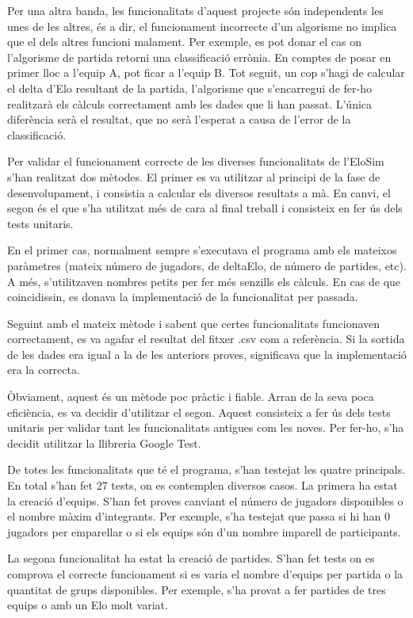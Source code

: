 \documentclass[a4paper]{article}
\begin{document}
Per una altra banda, les funcionalitats d'aquest projecte són independents les unes de les altres, és a dir, el funcionament incorrecte d'un algorisme no implica que el dels altres funcioni malament. Per exemple, es pot donar el cas on l'algorisme de partida retorni una classificació errònia. En comptes de posar en primer lloc a l'equip A, pot ficar a l'equip B. Tot seguit, un cop s'hagi de calcular el delta d'Elo resultant de la partida, l'algorisme que s'encarregui de fer-ho realitzarà els càlculs correctament amb les dades que li han passat. L'única diferència serà el resultat, que no serà l'esperat a causa de l'error de la classificació.

Per validar el funcionament correcte de les diverses funcionalitats de l'EloSim s'han realitzat dos mètodes. El primer es va utilitzar al principi de la fase de desenvolupament, i consistia a calcular els diversos resultats a mà. En canvi, el segon és el que s'ha utilitzat més de cara al final treball i consisteix en fer ús dels tests unitaris.

En el primer cas, normalment sempre s'executava el programa amb els mateixos paràmetres (mateix número de jugadors, de deltaElo, de número de partides, etc). A més, s'utilitzaven nombres petits per fer més senzills els càlculs. En cas de que coincidissin, es donava la implementació de la funcionalitat per passada.

Seguint amb el mateix mètode i sabent que certes funcionalitats funcionaven correctament, es va agafar el resultat del fitxer .csv com a referència. Si la sortida de les dades era igual a la de les anteriors proves, significava que la implementació era la correcta.

Òbviament, aquest és un mètode poc pràctic i fiable. Arran de la seva poca eficiència, es va decidir d'utilitzar el segon. Aquest consisteix a fer ús dels tests unitaris per validar tant les funcionalitats antigues com les noves. Per fer-ho, s'ha decidit utilitzar la llibreria Google Test.

De totes les funcionalitats que té el programa, s'han testejat les quatre principals. En total s'han fet 27 tests, on es contemplen diversos casos. La primera ha estat la creació d'equips. S'han fet proves canviant el número de jugadors disponibles o el nombre màxim d'integrants. Per exemple, s'ha testejat que passa si hi han 0 jugadors per emparellar o si els equips són d'un nombre imparell de participants.

La segona funcionalitat ha estat la creació de partides. S'han fet tests on es comprova el correcte funcionament si es varia el nombre d'equips per partida o la quantitat de grups disponibles. Per exemple, s'ha provat a fer partides de tres equips o amb un Elo molt variat.
\end{document}
